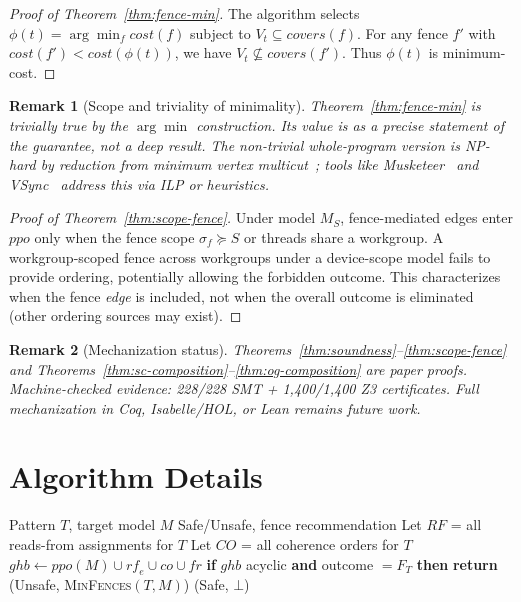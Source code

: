 \documentclass[11pt]{article}
\newtheorem{remark}{Remark}
\begin{document}
\begin{proof}[Proof of Theorem~\ref{thm:fence-min}]
The algorithm selects $\phi(t) = \arg\min_f \mathit{cost}(f)$ subject to
$V_t \subseteq \mathit{covers}(f)$. For any fence $f'$ with
$\mathit{cost}(f') < \mathit{cost}(\phi(t))$, we have
$V_t \not\subseteq \mathit{covers}(f')$. Thus $\phi(t)$ is minimum-cost.
\end{proof}

\begin{remark}[Scope and triviality of minimality]
\label{rem:fence-triviality}
Theorem~\ref{thm:fence-min} is trivially true by the $\arg\min$ construction.
Its value is as a precise statement of the guarantee, not a deep result.
The non-trivial whole-program version is NP-hard by reduction from minimum
vertex multicut~\cite{Alglave2014Musketeer}; tools like
Musketeer~\cite{Alglave2014Musketeer} and VSync~\cite{Oberhauser2021}
address this via ILP or heuristics.
\end{remark}

\begin{proof}[Proof of Theorem~\ref{thm:scope-fence}]
Under model $M_S$, fence-mediated edges enter $\mathit{ppo}$ only when
the fence scope $\sigma_f \succeq S$ or threads share a workgroup.
A workgroup-scoped fence across workgroups under a device-scope model
fails to provide ordering, potentially allowing the forbidden outcome.
This characterizes when the fence \emph{edge} is included, not when the
overall outcome is eliminated (other ordering sources may exist).
\end{proof}

\begin{remark}[Mechanization status]
Theorems~\ref{thm:soundness}--\ref{thm:scope-fence} and
Theorems~\ref{thm:sc-composition}--\ref{thm:og-composition} are paper proofs.
Machine-checked evidence: 228/228 SMT + 1{,}400/1{,}400 Z3 certificates.
Full mechanization in Coq, Isabelle/HOL, or Lean remains future work.
\end{remark}

\section{Algorithm Details}
\label{app:algorithms}

\begin{algorithm}[H]
\caption{Cross-Architecture Portability Check}
\label{alg:portcheck}
\begin{algorithmic}[1]
\REQUIRE Pattern $T$, target model $M$
\ENSURE Safe/Unsafe, fence recommendation
\STATE Let $\mathit{RF}$ = all reads-from assignments for $T$
\STATE Let $\mathit{CO}$ = all coherence orders for $T$
    \STATE $\mathit{ghb} \gets \mathit{ppo}(M) \cup \mathit{rf}_e \cup \mathit{co} \cup \mathit{fr}$
    \STATE \textbf{if} $\mathit{ghb}$ acyclic \textbf{and} outcome $= F_T$ \textbf{then}
    \STATE \quad \textbf{return} (Unsafe, \textsc{MinFences}$(T, M)$)
\ENDFOR
\RETURN (Safe, $\bot$)
\end{algorithmic}
\end{algorithm}
\end{document}
